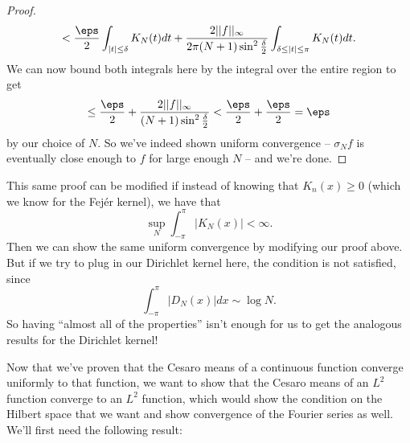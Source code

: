 \begin{proof}
\[
    < \frac{\eps}{2}\int_{|t| \le \delta} K_N(t) dt + \frac{2||f||_\infty}{2\pi(N+1) \sin^2\frac{\delta}{2}} \int_{\delta \le |t| \le \pi} K_N(t) dt.
\]
We can now bound both integrals here by the integral over the entire region to get 
\[
    \le \frac{\eps}{2} + \frac{2||f||_{\infty}}{(N+1) \sin^2\frac{\delta}{2}} < \frac{\eps}{2} + \frac{\eps}{2} = \eps
\]
by our choice of $N$. So we've indeed shown uniform convergence -- $\sigma_N f$ is eventually close enough to $f$ for large enough $N$ -- and we're done. 
\end{proof}

\begin{remark}
This same proof can be modified if instead of knowing that $K_n(x) \ge 0$ (which we know for the Fej\'er kernel), we have that
\[
    \sup_N \int_{-\pi}^{\pi} |K_N(x)| < \infty.
\]
Then we can show the same uniform convergence by modifying our proof above. But if we try to plug in our Dirichlet kernel here, the condition is not satisfied, since 
\[
    \int_{-\pi}^{\pi} |D_N(x)| dx \sim \log N.
\]
So having ``almost all of the properties'' isn't enough for us to get the analogous results for the Dirichlet kernel!
\end{remark}

Now that we've proven that the Cesaro means of a continuous function converge uniformly to that function, we want to show that the Cesaro means of an $L^2$ function converge to an $L^2$ function, which would show the condition on the Hilbert space that we want and show convergence of the Fourier series as well. We'll first need the following result:

